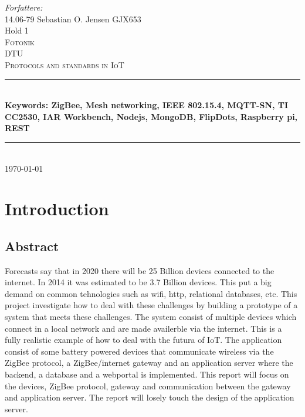 \documentclass[a4paper,12pt,english]{article}
\begin{document}
\begin{titlepage}

\newcommand{\HRule}{\rule{\linewidth}{0.4mm}}
\center
\small{ \emph{Forfattere:}\\
14.06-79 Sebastian O. Jensen \textsc{GJX653}
\\
Hold 1} \\[2cm]

\textsc{\LARGE Fotonik}\\[0.5cm]
\textsc{\large DTU}\\[1.5cm]
\textsc{\huge Protocols and standards in IoT}\\
\HRule \\[0.7cm]
{\bfseries Keywords: ZigBee, Mesh networking, IEEE 802.15.4, MQTT-SN,
TI CC2530, IAR Workbench, Nodejs, MongoDB, FlipDots, Raspberry pi,
REST}\\[0.4cm]
\HRule
\\[1.5cm] \textsc{\Large \textsc{\today}}\\[0.5cm]



\end{titlepage}

\tableofcontents

\section{Introduction}	
\subsection{Abstract}
Forecasts say that in 2020 there will be 25 Billion devices connected to the
internet. In 2014 it was estimated to be 3.7 Billion devices\cite{Gartner}.
This put a big demand on common tehnologies such as wifi, http, relational
databases, etc. This project investigate how to deal with these challenges by
building a prototype of a system that meets these challenges. The system
consist of multiple devices which connect in a local network and are made
availerble via the internet. This is a fully realistic example of how to deal
with the futura of IoT. The
application consist of some battery powered devices that communicate wireless
via the ZigBee protocol, a ZigBee/internet gateway and an application server
where the backend, a database and a webportal is implemented. This report will
focus on the devices, ZigBee protocol, gateway and communication between the
gateway and application server. The report will losely touch the design of the
application server.
\end{document}
